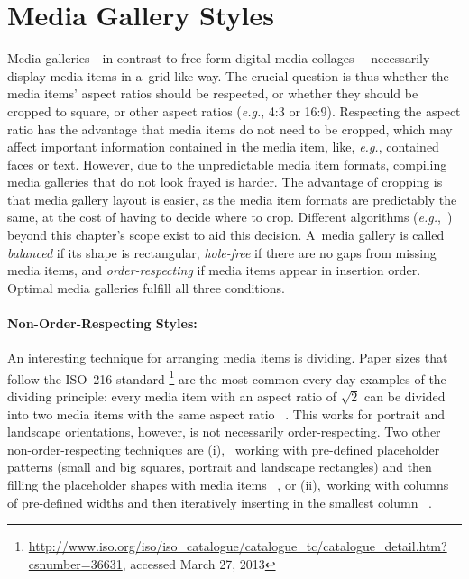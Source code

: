 \section{Media Gallery Styles}
\label{sec:mediagallerystyles}

Media galleries---in contrast to free-form digital media collages---%
necessarily display media items in a~grid-like way.
The crucial question is thus whether the media items' aspect ratios
should be respected, or whether they should be cropped to square,
or other aspect ratios (\emph{e.g.}, 4:3 or 16:9).
Respecting the aspect ratio has the advantage that media items
do not need to be cropped, which may affect important information
contained in the media item, like, \emph{e.g.}, 
contained faces or text.
However, due to the unpredictable media item formats,
compiling media galleries that do not look frayed is harder.
The advantage of cropping is that media gallery layout is easier,
as the media item formats are predictably the same,
at the cost of having to decide where to crop.
Different algorithms (\emph{e.g.},~\cite{suh2003thumbnail})
beyond this chapter's scope exist to aid this decision.
A~media gallery is called \emph{balanced} if its shape is rectangular,
\emph{hole-free} if there are no gaps from missing media items,
and \emph{order-respecting}
if media items appear in insertion order.
Optimal media galleries fulfill all three conditions.

\paragraph{Non-Order-Respecting Styles:}

An interesting technique for arranging media items is dividing.
Paper sizes that follow the ISO~216 standard%
\footnote{\url{http://www.iso.org/iso/iso_catalogue/catalogue_tc/catalogue_detail.htm?csnumber=36631},
accessed March 27, 2013}
are the most common every-day examples of the dividing principle:
every media item with an aspect ratio of $ \sqrt2 $ can be divided
into two media items with the same aspect ratio%
~\cite{chedeau2012lightboxandroid}.
This works for portrait and landscape orientations,
however, is not necessarily order-respecting.
Two other non-order-respecting techniques are (i),~%
working with pre-defined placeholder patterns
(small and big squares, portrait and landscape rectangles)
and then filling the placeholder shapes with media items%
~\cite{chedeau2012500px},
or (ii),~working with columns of pre-defined widths
and then iteratively inserting in the smallest column%
~\cite{chedeau2012lightbox}.

